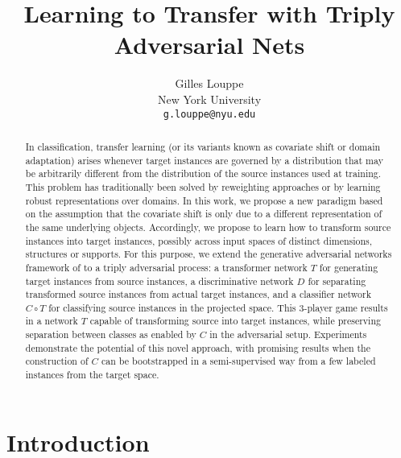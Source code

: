 \documentclass{article}
\title{Learning to Transfer with Triply Adversarial Nets}
\author{
Gilles Louppe \\
New York University\\
\texttt{g.louppe@nyu.edu} \\
}
\begin{document}
\maketitle

\begin{abstract}

In classification, transfer learning (or its variants known as covariate shift
or domain adaptation) arises whenever target instances are governed by a
distribution that may be arbitrarily different from the distribution of the
source instances used at training. This problem has traditionally been solved by reweighting
approaches or by learning robust representations over domains. In this work, we
propose a new paradigm based on the assumption that the covariate shift is only
due to a different representation of the same underlying objects.
Accordingly, we propose to learn how to transform source instances into target
instances, possibly across input spaces of distinct dimensions, structures or
supports. For this purpose, we extend the generative adversarial networks
framework of \cite{goodfellow2014generative} to a triply adversarial process: a
transformer network $T$ for generating target instances from source instances, a
discriminative network $D$ for separating transformed source instances from
actual target instances, and a classifier network $C \circ T$ for classifying source
instances in the projected space. This 3-player game results in a network $T$
capable of transforming source into target instances, while preserving
separation between classes as enabled by $C$ in the adversarial setup.
Experiments demonstrate the potential of this novel approach, with promising
results when the construction of $C$ can be bootstrapped in a semi-supervised
way  from a few labeled instances from the target space.

\end{abstract}

\section{Introduction}


\end{document}

